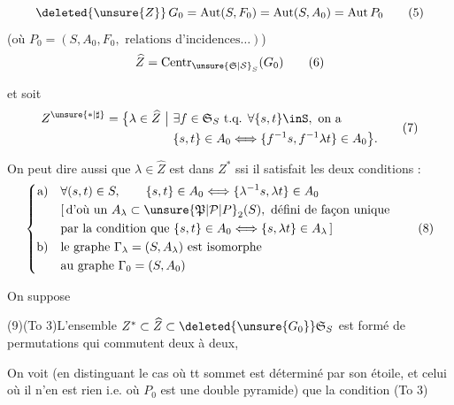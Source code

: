 
\[
\deleted{\unsure{Z}}\,G_0=\mathrm{Aut}(S,F_0)=\mathrm{Aut}(S,A_0)=\mathrm{Aut}\,P_0\tag*{(5)}
\]
(où $P_0=(S,A_0,F_0,\text{ relations d'incidences}\ldots)$)
\[
\widehat Z=\mathrm{Centr}_{\unsure{\mathfrak S|\mathcal S}_S}(G_0)\tag*{(6)}
\]

 et soit
\[
\begin{aligned}
Z^{\unsure{*|\sharp}}=\bigl\{\lambda\in\widehat Z\ \big|\ &\exists f\in\mathfrak S_S\ \text{t.q. }\forall\{s,t\}\inS,\ \text{on a}\\
&\{s,t\}\in A_0\Longleftrightarrow\{f^{-1}s,f^{-1}\lambda t\}\in A_0\bigr\}.
\end{aligned}\tag*{(7)}
\]

 On peut dire aussi que $\lambda\in\widehat Z$ est dans $Z^*$ ssi il satisfait les deux conditions :
\[
\left\{\begin{aligned}
\mathrm a)\quad &\forall(s,t)\in S,\qquad\{s,t\}\in A_0\Longleftrightarrow\{\lambda^{-1}s,\lambda t\}\in A_0\\
&[\,\text{d'où un } A_\lambda\subset\unsure{\mathfrak P|\mathcal P|P}_2(S),\ \text{défini de façon unique}\\
&\text{par la condition que }\{s,t\}\in A_0\Longleftrightarrow\{s,\lambda t\}\in A_\lambda\,]\\
\mathrm b)\quad &\text{le graphe }\Gamma_\lambda=(S,A_\lambda)\text{ est isomorphe}\\
&\text{au graphe }\Gamma_0=(S,A_0)
\end{aligned}\right.\tag*{(8)}
\]

On suppose

(9)\qquad (To 3)\qquad L'ensemble $Z^*\subset\widehat Z\subset\deleted{\unsure{G_0}}\mathfrak S_S$ est formé de  permutations qui commutent deux à deux, 

On voit (en distinguant le cas où tt sommet est déterminé par son étoile, et celui où il n'en est rien i.e. où $P_0$ est une double pyramide) que la condition (To 3)

